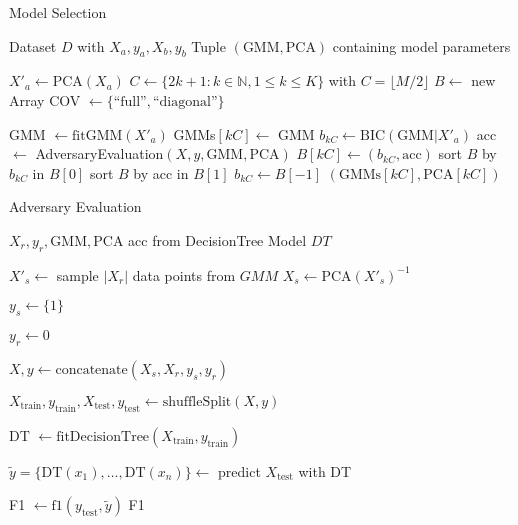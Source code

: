  \begin{algorithm}
    \caption{Model Selection}
    \label{alg:model_selection}
 
    \begin{algorithmic}[1]
        \REQUIRE Dataset $D$ with $X_a, y_a, X_b, y_b$
        \ENSURE Tuple $(\text{GMM}, \text{PCA})$ containing model parameters

        \STATE $X'_a \leftarrow \text{PCA}(X_a)$
        \STATE $C \leftarrow \{2k+1: k \in \mathbb{N}, 1 \leq k \leq K\}$ with $C=\lfloor M / 2 \rfloor$
        \STATE $B \leftarrow$ new Array
        \STATE COV $\leftarrow \{ \text{``full''}, \text{``diagonal''} \}$

                \STATE GMM $\leftarrow \text{fitGMM}(X'_a)$
                \STATE GMMs$[kC] \leftarrow$ GMM
                \STATE $b_{kC} \leftarrow \text{BIC}(\text{GMM}|X'_a)$
                \STATE acc $\leftarrow$ AdversaryEvaluation$(X, y, \text{GMM}, \text{PCA})$
                \STATE $B[kC] \leftarrow (b_{kC}, \text{acc})$
            \ENDFOR
        \ENDFOR
        \STATE sort $B$ by $b_{kC}$ in $B[0]$
        \STATE sort $B$ by acc in $B[1]$
        \STATE $b_{kC} \leftarrow B[-1]$
        \RETURN $(\text{GMMs}[kC], \text{PCA}[kC])$
    \end{algorithmic}
 \end{algorithm}


 \begin{algorithm}
    \caption{Adversary Evaluation}
    \label{alg:ml_efficacy}
 
    \begin{algorithmic}[1]
        \REQUIRE $X_r, y_r, \text{GMM}, \text{PCA}$
        \ENSURE acc from DecisionTree Model $DT$

        \STATE $X'_s \leftarrow$ sample $|X_r|$ data points from $GMM$
        \STATE $X_s \leftarrow \text{PCA}(X'_s)^{-1}$  

        \STATE $y_s \leftarrow \{ 1 \}$ 

        \STATE $y_r \leftarrow 0$ 
        
        \STATE $X, y \leftarrow \text{concatenate}(X_s, X_r, y_s, y_r)$
        
        \STATE $X_{\text{train}}, y_{\text{train}}, X_{\text{test}}, y_{\text{test}} \leftarrow \text{shuffleSplit}(X,y)$

        \STATE DT $\leftarrow \text{fitDecisionTree}(X_{\text{train}}, y_{\text{train}})$

        \STATE $\tilde{y} = \{\text{DT}(x_1), \dots, \text{DT}(x_n)\} \leftarrow$ predict $X_{\text{test}}$ with DT

        \STATE F1 $\leftarrow \text{f1}(y_{\text{test}}, \tilde{y})$
        \RETURN F1
    \end{algorithmic}
 \end{algorithm}


